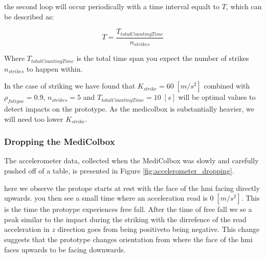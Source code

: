 \documentclass[../main.tex]{subfiles}
\begin{document}
the second loop will occur periodically with a time interval equalt to $T$, which can be described as:

$$T=\frac{T_{totalCountingTime}}{n_{strikes}}$$

Where $T_{totalCountingTime}$ is the total time span you expect the number of strikes $n_{strikes}$ to happen within.

In the case of striking we have found that $K_{strike} = 60\;[m/s^2]$
combined with $\rho_{fatigue} = 0.9$, $n_{strikes}=5$
and $T_{totalCountingTime}=10\;[s]$
will be optimal values to detect impacts on the prototype.
As the \gls{medicolbox} is substantially heavier,
we will need too lower $K_{strike}$.




\vspace{30px}

\subsubsection{Dropping the MediColbox}

The accelerometer data, collected when the MediColbox was slowly and carefully
pushed off of a table, is presented in
Figure \ref{fig:accelerometer_dropping}.

here we observe the protope starts at rest with the
face of the \gls{hmi} facing directly upwards.
you then see a small time where an acceleration read is $0\;[m/s^2]$.
This is the time the protoype experiences free fall.
After the time of free fall we se a peak similar to the
impact during the striking with the dirrefence of the
read acceleration in $z$ direction goes from being positiveto being negative.
This change suggests that the prototype changes orientation from where the
face of the \gls{hmi} faces upwards to be facing downwards.
\end{document}
